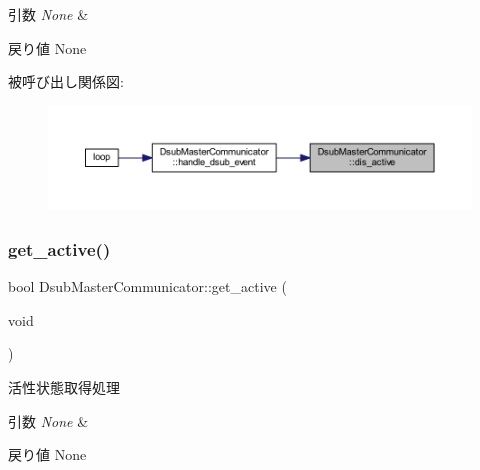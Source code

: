 \begin{DoxyParams}{引数}
{\em None} & \\
\hline
\end{DoxyParams}
\begin{DoxyReturn}{戻り値}
None 
\end{DoxyReturn}
被呼び出し関係図\+:\nopagebreak
\begin{figure}[H]
\begin{center}
\leavevmode
\includegraphics[width=350pt]{class_dsub_master_communicator_ac0a9298c691adbdf844f85d680d7e554_icgraph}
\end{center}
\end{figure}
\mbox{\label{class_dsub_master_communicator_a81a0576ab39cc508c879336038c4fd4a}} 
\subsubsection{\texorpdfstring{get\_active()}{get\_active()}}
{\footnotesize\ttfamily bool Dsub\+Master\+Communicator\+::get\+\_\+active (\begin{DoxyParamCaption}\item[{void}]{ }\end{DoxyParamCaption})}



活性状態取得処理 


\begin{DoxyParams}{引数}
{\em None} & \\
\hline
\end{DoxyParams}
\begin{DoxyReturn}{戻り値}
None 
\end{DoxyReturn}
\mbox{\label{class_dsub_master_communicator_a91a5a356d0aa58a30f3381522cd7616f}} 
